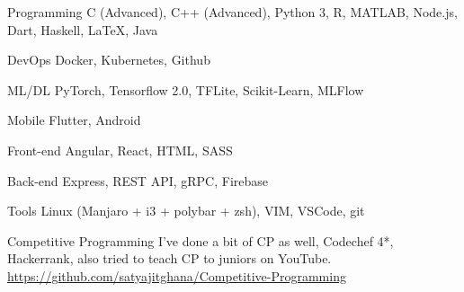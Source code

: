 
\begin{cvskills}

\cvskill
    {Programming}
    {C (Advanced), C++ (Advanced), Python 3, R, MATLAB, Node.js, Dart, Haskell, LaTeX, Java}

\cvskill
    {DevOps}
    {Docker, Kubernetes, Github}

\cvskill
    {ML/DL}
    {PyTorch, Tensorflow 2.0, TFLite, Scikit-Learn, MLFlow}

\cvskill
    {Mobile}
    {Flutter, Android}

\cvskill
    {Front-end}
    {Angular, React, HTML, SASS}

\cvskill
    {Back-end}
    {Express, REST API, gRPC, Firebase}

\cvskill
    {Tools}
    {Linux (Manjaro + i3 + polybar + zsh), VIM, VSCode, git}

\end{cvskills}

\begin{cventries}
  \cventry
    {}
    {Competitive Programming}
    {}
    {}
    {I've done a bit of CP as well, Codechef 4*, Hackerrank, also tried to teach CP to juniors on YouTube. \url{https://github.com/satyajitghana/Competitive-Programming}
    }
\end{cventries}